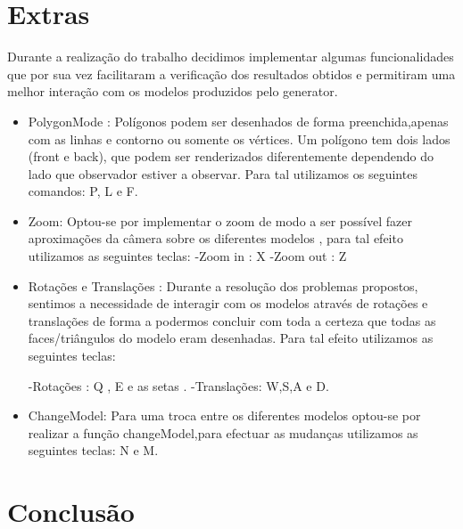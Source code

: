 \documentclass{article}
\begin{document}
\section{Extras}

Durante a realização do trabalho decidimos implementar algumas funcionalidades que por sua vez facilitaram a verificação dos resultados obtidos e permitiram uma melhor interação com os modelos produzidos pelo generator. 

\begin{itemize}

\item PolygonMode : Polígonos podem ser desenhados de forma preenchida,apenas com as linhas e contorno ou
somente os vértices. Um polígono tem dois lados (front e back), que podem ser renderizados diferentemente dependendo do lado que observador estiver a observar. Para tal utilizamos os seguintes comandos:
P, L e F.

\item Zoom: Optou-se por implementar o zoom de modo a ser possível fazer aproximações da câmera sobre os diferentes modelos , para tal efeito utilizamos as seguintes teclas:
-Zoom in :  X
-Zoom out : Z

\item Rotações e Translações : Durante a resolução dos problemas propostos, sentimos a necessidade de
interagir com os modelos através de rotações e translações de forma a podermos concluir com toda a
certeza que todas as faces/triângulos do modelo eram desenhadas. Para tal efeito utilizamos as seguintes teclas:

-Rotações : Q , E e as setas .
-Translações: W,S,A e D.

\item ChangeModel: Para uma troca entre os diferentes modelos optou-se por realizar a função changeModel,para efectuar as mudanças utilizamos as seguintes teclas: N e M.
\end{itemize}



\section{Conclusão}
\end{document}
